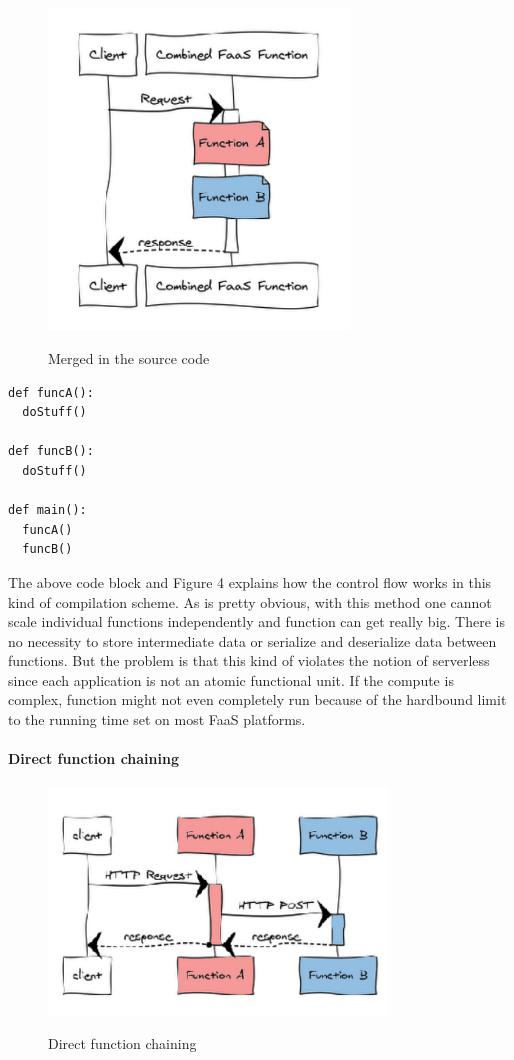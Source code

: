 \documentclass[12pt,titlepage]{article}
\begin{document}
\begin{figure}
\caption{Merged in the source code}
\centering
\includegraphics[width=80mm]{./thesis_images/manual_comp.png}
\label{fig:Manual compilation}
\end{figure}

\begin{lstlisting}
def funcA():
  doStuff()

def funcB():
  doStuff()

def main():
  funcA()
  funcB()
\end{lstlisting}

The above code block and Figure 4 explains how the control flow works in this
kind of compilation scheme. As is pretty obvious, with this method one cannot
scale individual functions independently and function can get really big. There
is no necessity to store intermediate data or serialize and deserialize data
between functions. But the problem is that this kind of violates the notion of
serverless since each application is not an atomic functional unit. If the
compute is complex, function might not even completely run because of the
hardbound limit to the running time set on most FaaS platforms. 

\paragraph{Direct function chaining}
\label{sec:org4213e1f}

\begin{figure}
\caption{Direct function chaining}
\centering
\includegraphics[width=90mm]{./thesis_images/func_chain.png}
\label{fig:Chaining}
\end{figure}
\end{document}

